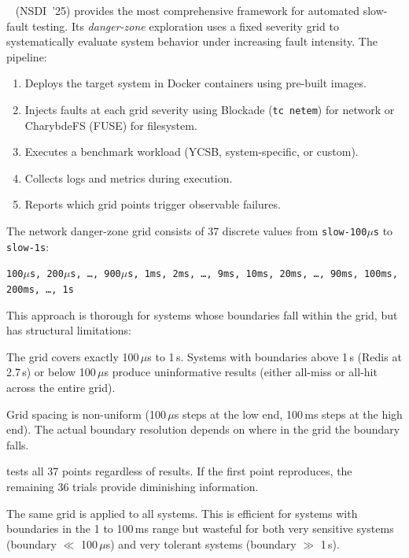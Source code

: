 \xinda{}~\cite{xinda} (NSDI~'25) provides the most comprehensive framework for
automated slow-fault testing. Its \emph{danger-zone} exploration uses a fixed
severity grid to systematically evaluate system behavior under increasing fault
intensity. The pipeline:

\begin{enumerate}[leftmargin=*,topsep=2pt,itemsep=1pt]
  \item Deploys the target system in Docker containers using pre-built images.
  \item Injects faults at each grid severity using Blockade (\texttt{tc netem})
        for network or CharybdeFS (FUSE) for filesystem.
  \item Executes a benchmark workload (YCSB, system-specific, or custom).
  \item Collects logs and metrics during execution.
  \item Reports which grid points trigger observable failures.
\end{enumerate}

The network danger-zone grid consists of 37 discrete values from
\texttt{slow-100$\mu$s} to \texttt{slow-1s}:

\begin{center}
\small
\texttt{100$\mu$s, 200$\mu$s, \ldots, 900$\mu$s, 1ms, 2ms, \ldots, 9ms,
10ms, 20ms, \ldots, 90ms, 100ms, 200ms, \ldots, 1s}
\end{center}

This approach is thorough for systems whose boundaries fall within the grid,
but has structural limitations:

 The grid covers exactly 100\,$\mu$s to 1\,s. Systems with
boundaries above 1\,s (Redis at 2.7\,s) or below 100\,$\mu$s produce
uninformative results (either all-miss or all-hit across the entire grid).

 Grid spacing is non-uniform (100\,$\mu$s steps at the
low end, 100\,ms steps at the high end). The actual boundary resolution depends
on where in the grid the boundary falls.

 \xinda{} tests all 37 points regardless of results.
If the first point reproduces, the remaining 36 trials provide diminishing
information.

 The same grid is applied to all systems. This is
efficient for systems with boundaries in the 1 to 100\,ms range but wasteful for
both very sensitive systems (boundary $\ll$ 100\,$\mu$s) and very tolerant
systems (boundary $\gg$ 1\,s).

